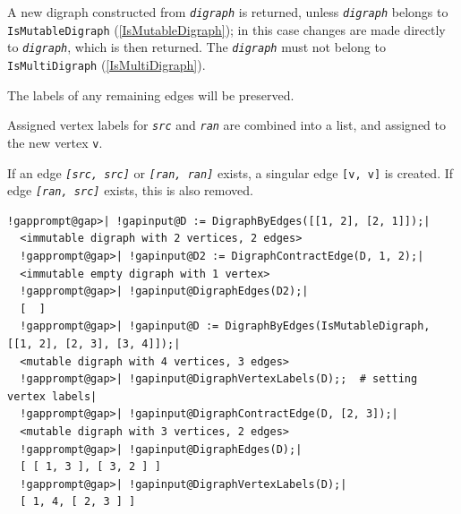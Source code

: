 \documentclass[a4paper,11pt]{report}
\begin{document}
{{{ A new digraph constructed from \mbox{\texttt{\mdseries\slshape digraph}} is returned, unless \mbox{\texttt{\mdseries\slshape digraph}} belongs to \texttt{IsMutableDigraph} (\ref{IsMutableDigraph}); in this case changes are made directly to \mbox{\texttt{\mdseries\slshape digraph}}, which is then returned. The \mbox{\texttt{\mdseries\slshape digraph}} must not belong to \texttt{IsMultiDigraph} (\ref{IsMultiDigraph}). 

 The labels of any remaining edges will be preserved. 

 Assigned vertex labels for \mbox{\texttt{\mdseries\slshape src}} and \mbox{\texttt{\mdseries\slshape ran}} are combined into a list, and assigned to the new vertex \texttt{v}. 

 If an edge \mbox{\texttt{\mdseries\slshape [src, src]}} or \mbox{\texttt{\mdseries\slshape [ran, ran]}} exists, a singular edge \texttt{[v, v]} is created. If edge \mbox{\texttt{\mdseries\slshape [ran, src]}} exists, this is also removed. 

 
\begin{Verbatim}[commandchars=!@|,fontsize=\small,frame=single,label=Example]
  !gapprompt@gap>| !gapinput@D := DigraphByEdges([[1, 2], [2, 1]]);|
  <immutable digraph with 2 vertices, 2 edges>
  !gapprompt@gap>| !gapinput@D2 := DigraphContractEdge(D, 1, 2);|
  <immutable empty digraph with 1 vertex>
  !gapprompt@gap>| !gapinput@DigraphEdges(D2);|
  [  ]
  !gapprompt@gap>| !gapinput@D := DigraphByEdges(IsMutableDigraph, [[1, 2], [2, 3], [3, 4]]);|
  <mutable digraph with 4 vertices, 3 edges>
  !gapprompt@gap>| !gapinput@DigraphVertexLabels(D);;  # setting vertex labels|
  !gapprompt@gap>| !gapinput@DigraphContractEdge(D, [2, 3]);|
  <mutable digraph with 3 vertices, 2 edges>
  !gapprompt@gap>| !gapinput@DigraphEdges(D);|
  [ [ 1, 3 ], [ 3, 2 ] ]
  !gapprompt@gap>| !gapinput@DigraphVertexLabels(D);|
  [ 1, 4, [ 2, 3 ] ]
\end{Verbatim}
 }

 

}}
\end{document}
